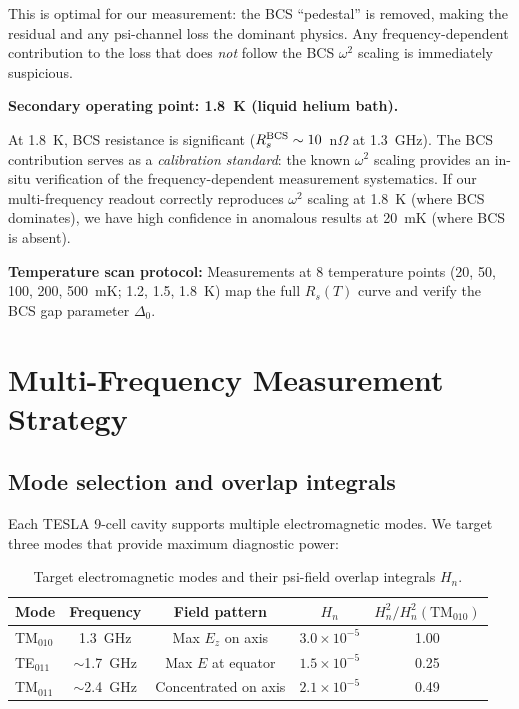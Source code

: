 \documentclass[11pt]{article}
\newcommand{\ee}[1]{\times 10^{#1}}
\newcommand{\Heff}{H_n}
\begin{document}
This is optimal for our measurement: the BCS ``pedestal'' is removed,
making the residual and any psi-channel loss the dominant physics. Any
frequency-dependent contribution to the loss that does \textit{not}
follow the BCS $\omega^2$ scaling is immediately suspicious.

\textbf{Secondary operating point: 1.8~K (liquid helium bath).}

At 1.8~K, BCS resistance is significant ($R_s^{\rm BCS} \sim
10$~n$\Omega$ at 1.3~GHz). The BCS contribution serves as a
\textit{calibration standard}: the known $\omega^2$ scaling provides an
in-situ verification of the frequency-dependent measurement systematics.
If our multi-frequency readout correctly reproduces $\omega^2$ scaling
at 1.8~K (where BCS dominates), we have high confidence in anomalous
results at 20~mK (where BCS is absent).

\textbf{Temperature scan protocol:} Measurements at 8 temperature
points (20, 50, 100, 200, 500~mK; 1.2, 1.5, 1.8~K) map the full
$R_s(T)$ curve and verify the BCS gap parameter $\Delta_0$.


\section{Multi-Frequency Measurement Strategy}
\label{sec:multi_freq}

\subsection{Mode selection and overlap integrals}

Each TESLA 9-cell cavity supports multiple electromagnetic modes.
We target three modes that provide maximum diagnostic power:

\begin{table}[H]
\centering
\caption{Target electromagnetic modes and their psi-field overlap
integrals $\Heff$.}
\label{tab:modes}
\renewcommand{\arraystretch}{1.25}
\begin{tabular}{@{}lcccc@{}}
\toprule
\textbf{Mode} & \textbf{Frequency} & \textbf{Field pattern} &
  $\Heff$ & $\Heff^2/\Heff^2(\text{TM}_{010})$ \\
\midrule
TM$_{010}$ & 1.3~GHz & Max $E_z$ on axis & $3.0\ee{-5}$ & 1.00 \\
TE$_{011}$ & $\sim$1.7~GHz & Max $E$ at equator & $1.5\ee{-5}$ & 0.25 \\
TM$_{011}$ & $\sim$2.4~GHz & Concentrated on axis & $2.1\ee{-5}$ & 0.49 \\
\bottomrule
\end{tabular}
\end{table}
\end{document}
